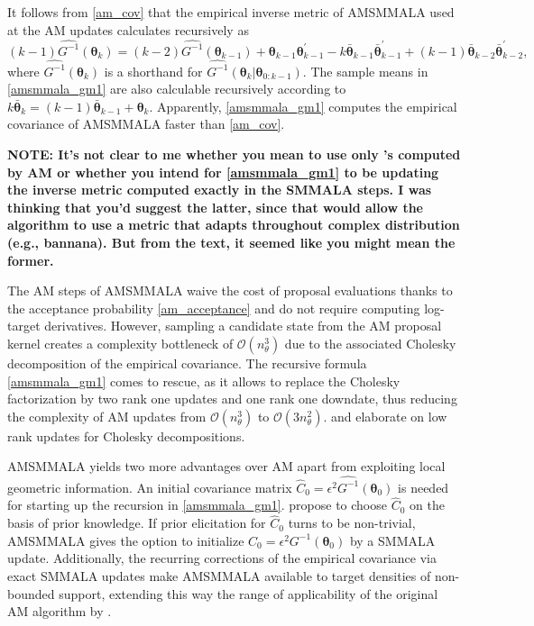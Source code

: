 \documentclass[twoside,11pt]{article}
\begin{document}
{It follows from \eqref{am_cov} that the empirical inverse metric of AMSMMALA used at the AM updates calculates recursively as
\begin{equation}
\label{amsmmala_gm1}
(k-1)\widehat{G^{-1}}(\boldsymbol{\theta}_{k})=
(k-2)\widehat{G^{-1}}(\boldsymbol{\theta}_{k-1})+
\boldsymbol{\theta}_{k-1} \boldsymbol{\theta}_{k-1}^{'}-
k\bar{\boldsymbol{\theta}}_{k-1} \bar{\boldsymbol{\theta}}_{k-1}^{'}+
(k-1)\bar{\boldsymbol{\theta}}_{k-2} \bar{\boldsymbol{\theta}}_{k-2}^{'},
\end{equation}
where $\widehat{G^{-1}}(\boldsymbol{\theta}_{k})$ is a shorthand for 
$\widehat{G^{-1}}(\boldsymbol{\theta}_{k}|\boldsymbol{\theta}_{0:k-1})$.
The sample means in \eqref{amsmmala_gm1} are also calculable recursively according to
$k\bar{\boldsymbol{\theta}}_k=(k-1)\bar{\boldsymbol{\theta}}_{k-1}+\boldsymbol{\theta}_k$. Apparently, \eqref{amsmmala_gm1}
computes the empirical covariance of AMSMMALA faster than \eqref{am_cov}.

{\bf NOTE:  It's not clear to me whether you mean to use only 's computed by AM or whether you intend for \eqref{amsmmala_gm1} to be updating the inverse metric computed exactly in the SMMALA steps.  I was thinking that you'd suggest the latter, since that would allow the algorithm to use a metric that adapts throughout complex distribution (e.g., bannana). But from the text, it seemed like you might mean the former.}

The AM steps of AMSMMALA waive the cost of proposal evaluations thanks to the acceptance probability \eqref{am_acceptance}
and do not require computing log-target derivatives. However, sampling a candidate state from the AM proposal kernel creates
a complexity bottleneck of $\mathcal{O}(n_{\theta}^3)$ due to the associated Cholesky decomposition of the empirical 
covariance. The recursive formula \eqref{amsmmala_gm1} comes to rescue, as it allows to replace the Cholesky factorization 
by two rank one updates and one rank one downdate, thus reducing the complexity of AM updates from 
$\mathcal{O}(n_{\theta}^3)$ to $\mathcal{O}(3n_{\theta}^2)$. \cite{gill_gol_wal__met} and \cite{see__low} elaborate on low 
rank updates for Cholesky decompositions.

AMSMMALA yields two more advantages over AM apart from exploiting local geometric information. An initial covariance matrix
$\hat{C}_0=\epsilon^2\widehat{G^{-1}}(\boldsymbol{\theta}_{0})$ is needed for starting up the recursion in
\eqref{amsmmala_gm1}. \cite{haa_sak_tam__ana} propose to choose $\hat{C}_0$ on the basis of prior knowledge. If prior 
elicitation for $\hat{C}_0$ turns to be non-trivial, AMSMMALA gives the option to initialize $C_0=\epsilon^2 
G^{-1}(\boldsymbol{\theta}_{0})$ by a SMMALA update. Additionally, the recurring corrections of the empirical covariance via 
exact SMMALA updates make AMSMMALA available to target densities of non-bounded support, extending this way the range of 
applicability of the original AM algorithm by \cite{haa_sak_tam__ana}. 

}
\end{document}
